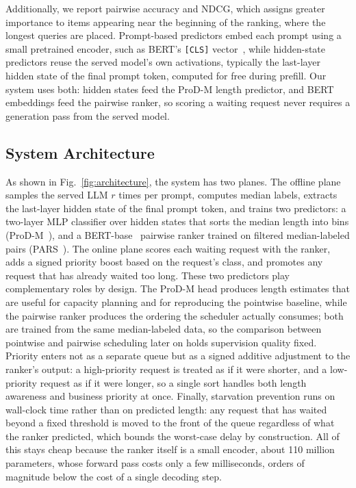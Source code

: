 \documentclass[conference]{IEEEtran}
\begin{document}
Additionally, we report pairwise accuracy and NDCG, which assigns greater
importance to items appearing near the beginning of the ranking, where the longest queries are placed. Prompt-based predictors embed each prompt using a small pretrained encoder, such as BERT's \texttt{[CLS]} vector~\cite{devlin2019bert}, while hidden-state predictors reuse the served model's own activations, typically the last-layer hidden state of the final prompt token, computed for free during prefill. Our system uses both: hidden states feed the ProD-M length predictor,
and BERT embeddings feed the pairwise ranker, so scoring a waiting request never
requires a generation pass from the served model.

\subsection{System Architecture}
As shown in Fig.~\ref{fig:architecture}, the system has two planes. The offline plane samples the served LLM $r$ times per prompt, computes median labels, extracts the last-layer hidden state of the final prompt token, and trains two predictors: a two-layer MLP classifier over hidden states that sorts the median length into bins (ProD-M~\cite{wang2026prodm}), and a BERT-base~\cite{devlin2019bert} pairwise ranker trained on filtered median-labeled pairs (PARS~\cite{tao2025pars}). The online plane scores each waiting request with the ranker, adds a signed priority boost based on the request's class, and promotes any request that has already waited too long.
These two predictors play complementary roles by design. The ProD-M head produces length estimates that are useful for capacity planning and for reproducing the pointwise baseline, while the pairwise ranker produces the ordering the scheduler actually consumes; both are trained from the same median-labeled data, so the comparison between pointwise and pairwise scheduling later on holds supervision quality fixed. Priority enters not as a separate queue but as a signed additive adjustment to the ranker's output: a high-priority request is treated as if it were shorter, and a low-priority request as if it were longer, so a single sort handles both length awareness and business priority at once. Finally, starvation prevention runs on wall-clock time rather than on predicted length: any request that has waited beyond a fixed threshold is moved to the front of the queue regardless of what the ranker predicted, which bounds the worst-case delay by construction. All of this stays cheap because the ranker itself is a small encoder, about 110 million parameters, whose forward pass costs only a few milliseconds, orders of magnitude below the cost of a single decoding step.
\end{document}
